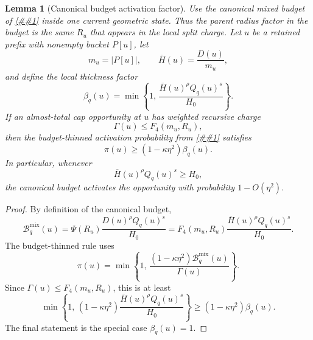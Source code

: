 \documentclass[10pt]{article}
\newcommand{\cref}[1]{\ref{##1}}
\newtheorem{lemma}[theorem]{Lemma}
\theoremstyle{definition}
\begin{document}
\begin{lemma}[Canonical budget activation factor]\label{lem:canonical-budget-activation}
   Use the canonical mixed budget of \cref{lem:canonical-mixed-budget} inside
   one current geometric state. Thus the parent radius factor in the budget is
   the same $R_u$ that appears in the local split charge. Let $u$ be a retained
   prefix with nonempty bucket $P[u]$, let
   \[
      m_u=|P[u]|,
      \qquad
      \overline H(u)=\frac{D(u)}{m_u},
   \]
   and define the local thickness factor
   \[
      \beta_q(u)
      =
      \min\left\{
         1,\,
         \frac{\overline H(u)^\rho Q_q(u)^s}{H_0}
      \right\}.
   \]
   If an almost-total cap opportunity at $u$ has weighted recursive charge
   \[
      \Gamma(u)\le F_4(m_u,R_u),
   \]
   then the budget-thinned activation probability from
   \cref{lem:budget-thinned-opportunities} satisfies
   \[
      \pi(u)\ge (1-\kappa\eta^2)\beta_q(u).
   \]
   In particular, whenever
   \[
      \overline H(u)^\rho Q_q(u)^s\ge H_0,
   \]
   the canonical budget activates the opportunity with probability
   $1-O(\eta^2)$.
\end{lemma}

\begin{proof}
   By definition of the canonical budget,
   \[
      \mathcal B_q^{\mathrm{mix}}(u)
      =
      \Psi(R_u)\frac{D(u)^\rho Q_q(u)^s}{H_0}
      =
      F_4(m_u,R_u)
      \frac{\overline H(u)^\rho Q_q(u)^s}{H_0}.
   \]
   The budget-thinned rule uses
   \[
      \pi(u)
      =
      \min\left\{
         1,\,
         \frac{(1-\kappa\eta^2)\mathcal B_q^{\mathrm{mix}}(u)}
              {\Gamma(u)}
      \right\}.
   \]
   Since $\Gamma(u)\le F_4(m_u,R_u)$, this is at least
   \[
      \min\left\{
         1,\,
         (1-\kappa\eta^2)
         \frac{\overline H(u)^\rho Q_q(u)^s}{H_0}
      \right\}
      \ge
      (1-\kappa\eta^2)\beta_q(u).
   \]
   The final statement is the special case $\beta_q(u)=1$.
\end{proof}
\end{document}
